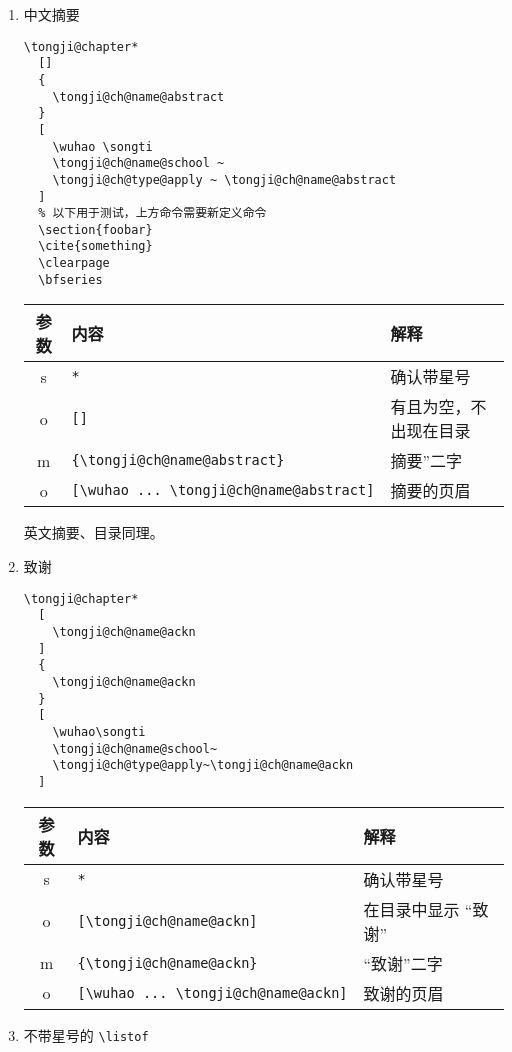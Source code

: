 \documentclass[../Main/thesis.tex]{subfiles}
\begin{document}
\begin{enumerate}

  \item 中文摘要

\begin{lstlisting}[language={TongjiLaTeX},style=colorEX]
\tongji@chapter*
  []
  {
    \tongji@ch@name@abstract
  }
  [
    \wuhao \songti
    \tongji@ch@name@school ~
    \tongji@ch@type@apply ~ \tongji@ch@name@abstract
  ]
  % 以下用于测试，上方命令需要新定义命令
  \section{foobar}
  \cite{something}
  \clearpage
  \bfseries
\end{lstlisting}

  \begin{longtable}[]{@{}cll@{}}
  \toprule
  参数 & 内容 & 解释\tabularnewline
  \midrule
  \endhead
  s & \texttt{*} & 确认带星号 \tabularnewline
  o & \texttt{[]} & 有且为空，不出现在目录 \tabularnewline
  m & \texttt{\{\textbackslash{}tongji@ch@name@abstract\}} &
  摘要''二字 \tabularnewline
  o &
  \texttt{[\textbackslash{}wuhao\ ...\ \textbackslash{}tongji@ch@name@abstract]}
  & 摘要的页眉\tabularnewline
  \bottomrule
  \end{longtable}

  英文摘要、目录同理。

  \item 致谢

\begin{lstlisting}[language={TongjiLaTeX}, style=colorEX]
\tongji@chapter*
  [
    \tongji@ch@name@ackn
  ]
  {
    \tongji@ch@name@ackn
  }
  [
    \wuhao\songti
    \tongji@ch@name@school~
    \tongji@ch@type@apply~\tongji@ch@name@ackn
  ]
\end{lstlisting}

  \begin{longtable}[]{@{}cll@{}}
  \toprule
  参数 & 内容 & 解释\tabularnewline
  \midrule
  \endhead
  s & \texttt{*} & 确认带星号\tabularnewline
  o & \texttt{[\textbackslash{}tongji@ch@name@ackn]} &
  在目录中显示 “致谢” \tabularnewline
  m & \texttt{\{\textbackslash{}tongji@ch@name@ackn\}} &
  “致谢”二字\tabularnewline
  o &
  \texttt{[\textbackslash{}wuhao\ ...\ \textbackslash{}tongji@ch@name@ackn]}
  & 致谢的页眉\tabularnewline
  \bottomrule
  \end{longtable}

\item 不带星号的 \texttt{\textbackslash{}listof}


\end{enumerate}
\end{document}
